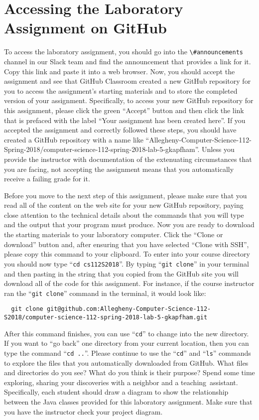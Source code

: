 \documentclass[11pt]{article}
\newcommand{\command}[1]{``\lstinline{#1}''}
\newcommand{\channel}[1]{\lstinline{#1}}
\newcommand{\step}[1]{``{#1}''}
\begin{document}
\section*{Accessing the Laboratory Assignment on GitHub}

To access the laboratory assignment, you should go into the
\channel{\#announcements} channel in our Slack team and find the announcement
that provides a link for it. Copy this link and paste it into a web browser.
Now, you should accept the assignment and see that GitHub Classroom created a
new GitHub repository for you to access the assignment's starting materials and
to store the completed version of your assignment. Specifically, to access your
new GitHub repository for this assignment, please click the green ``Accept''
button and then click the link that is prefaced with the label ``Your assignment
has been created here''. If you accepted the assignment and correctly followed
these steps, you should have created a GitHub repository with a name like
``Allegheny-Computer-Science-112-Spring-2018/computer-science-112-spring-2018-lab-5-gkapfham''.
Unless you provide the instructor with documentation of the extenuating
circumstances that you are facing, not accepting the assignment means that you
automatically receive a failing grade for it.

Before you move to the next step of this assignment, please make sure that you
read all of the content on the web site for your new GitHub repository, paying
close attention to the technical details about the commands that you will type
and the output that your program must produce. Now you are ready to download the
starting materials to your laboratory computer. Click the ``Clone or download''
button and, after ensuring that you have selected ``Clone with SSH'', please
copy this command to your clipboard. To enter into your course directory you
should now type \command{cd cs112S2018}. By typing \command{git clone} in your
terminal and then pasting in the string that you copied from the GitHub site you
will download all of the code for this assignment. For instance, if the course
instructor ran the \command{git clone} command in the terminal, it would look
like:

\begin{lstlisting}
  git clone git@github.com:Allegheny-Computer-Science-112-S2018/computer-science-112-spring-2018-lab-5-gkapfham.git
\end{lstlisting}

After this command finishes, you can use \command{cd} to change into the new
directory. If you want to \step{go back} one directory from your current
location, then you can type the command \command{cd ..}. Please continue to use
the \command{cd} and \command{ls} commands to explore the files that you
automatically downloaded from GitHub. What files and directories do you see?
What do you think is their purpose? Spend some time exploring, sharing your
discoveries with a neighbor and a \mbox{teaching assistant}. Specifically, each
student should draw a diagram to show the relationship between the Java classes
provided for this laboratory assignment. Make sure that you have the instructor
check your project diagram.
\end{document}
